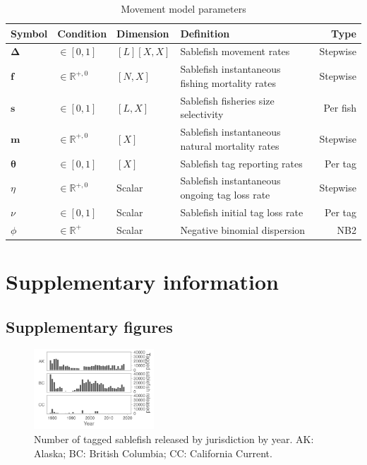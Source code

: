 \documentclass{article}
\begin{document}
\begin{table}[ht]
  \centering
  \caption{Movement model parameters}
  \renewcommand\arraystretch{1.2}
  \label{tab:model-parameters}
  \begin{tabular}{l l l l r}
    \toprule
    \textbf{Symbol} & \textbf{Condition} & \textbf{Dimension} & \textbf{Definition} & \textbf{Type} \\
    \toprule
    $\boldsymbol{\Delta}$ & $\in \left[0, 1 \right]$ & $[L][X, X]$ & Sablefish movement rates & Stepwise \\
    $\bm{f}$ & $\in \mathbb{R}^{+,0}$ & $[N, X]$ & Sablefish instantaneous fishing mortality rates & Stepwise \\
    $\bm{s}$ & $\in \left[0, 1 \right]$ & $[L, X]$ & Sablefish fisheries size selectivity & Per fish \\
    $\bm{m}$ & $\in \mathbb{R}^{+,0}$ & $[X]$ & Sablefish instantaneous natural mortality rates & Stepwise \\
    $\boldsymbol{\theta}$ & $\in \left[0, 1 \right]$ & $[X]$ & Sablefish tag reporting rates & Per tag \\
    $\eta$ & $\in \mathbb{R}^{+,0}$ & Scalar & Sablefish instantaneous ongoing tag loss rate & Stepwise \\
    $\nu$ & $\in \left[0, 1 \right]$ & Scalar & Sablefish initial tag loss rate & Per tag \\    
    $\phi$ & $\in \mathbb{R}^{+}$ & Scalar & Negative binomial dispersion & NB2 \\
    \bottomrule
  \end{tabular}
\end{table}






\section{Supplementary information}

\subsection{Supplementary figures}

\begin{figure}[htb]
    \centering
    \includegraphics[width = 0.4\textwidth]{bar-regions-3-released-by-year}
    \caption{Number of tagged sablefish released by jurisdiction by year. AK: Alaska; BC: British Columbia; CC: California Current.}
    \label{fig:bar-regions-3-released-by-year}
\end{figure}
\end{document}
